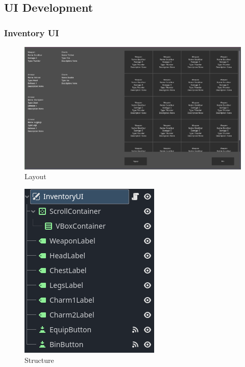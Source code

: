 \documentclass{article}
\begin{document}
        \subsection{UI Development}
        \subsubsection{Inventory UI}
        \begin{multicols}{2}
                \begin{figure}[H]
                        \centering
                        \includegraphics[width = 0.8\columnwidth]{images/development/InventoryUI_layout.PNG}
                        \caption{Layout}
                \end{figure}
                \begin{figure}[H]
                        \centering
                        \includegraphics[width = 0.8\columnwidth]{images/development/InventoryUI_structure.PNG}
                        \caption{Structure}
                \end{figure}   
        \end{multicols}
\end{document}
